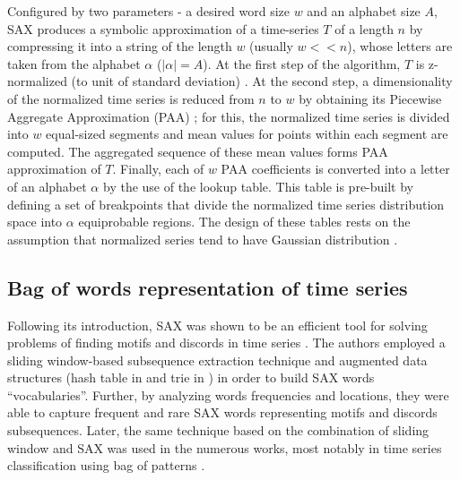 \documentclass[conference]{IEEEtran}
\begin{document}
Configured by two parameters - a desired word size $w$ and an alphabet size $A$,
SAX produces a symbolic approximation of a time-series $T$ of a length $n$ by compressing 
it into a string of the length $w$ (usually $w<<n$), whose letters are taken from 
the alphabet $\alpha$ ($|\alpha|=A$). 
At the first step of the algorithm, $T$ is z-normalized (to unit of standard deviation)
\cite{goldin_kanellakis}. 
At the second step, a dimensionality of the normalized time series is reduced from $n$ to $w$ by
obtaining its Piecewise Aggregate Approximation (PAA) \cite{paa}; for this, the normalized time
series is
divided into $w$ equal-sized segments and mean values for points within each segment are computed.
The aggregated sequence of these mean values forms PAA approximation of $T$. Finally, each of $w$
PAA coefficients is converted into a letter of an alphabet $\alpha$ by the use of the lookup table.
This table is pre-built by defining a set of breakpoints that divide the normalized time series
distribution 
space into $\alpha$ equiprobable regions. The design of these tables rests on the assumption 
that normalized series tend to have Gaussian distribution \cite{larsen_marx}.

\subsection{Bag of words representation of time series} \label{bow_representation}
Following its introduction, SAX was shown to be an efficient tool for solving problems 
of finding motifs and discords in time series \cite{motifs, hot_sax}. 
The authors employed a sliding window-based subsequence extraction technique 
and augmented data structures (hash table in \cite{motifs} and trie in \cite{hot_sax}) 
in order to build SAX words ``vocabularies''. Further, by analyzing words frequencies 
and locations, they were able to capture frequent and rare SAX words representing 
motifs and discords subsequences. Later, the same technique based on the combination 
of sliding window and SAX was used in the numerous works, most notably in time series 
classification using bag of patterns \cite{bag_patterns}. 
\end{document}
